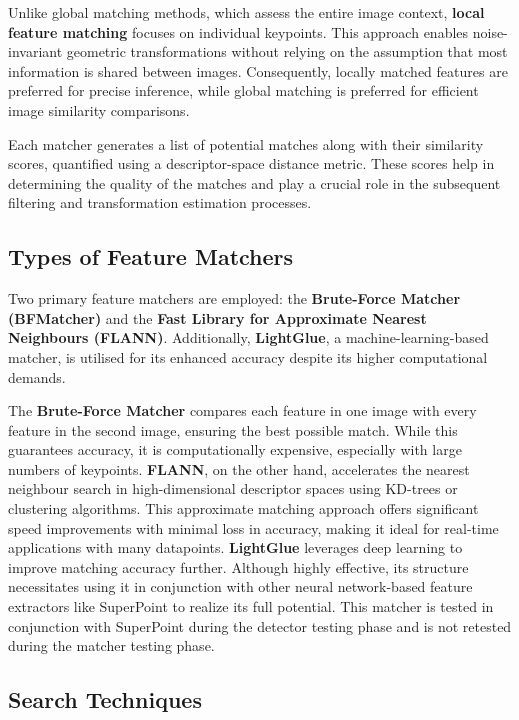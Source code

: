 Unlike global matching methods, which assess the entire image context, \textbf{local feature matching} focuses on individual keypoints. This approach enables noise-invariant geometric transformations without relying on the assumption that most information is shared between images. Consequently, locally matched features are preferred for precise inference, while global matching is preferred for efficient image similarity comparisons.

Each matcher generates a list of potential matches along with their similarity scores, quantified using a descriptor-space distance metric. These scores help in determining the quality of the matches and play a crucial role in the subsequent filtering and transformation estimation processes.

\subsection{Types of Feature Matchers}

Two primary feature matchers are employed: the \textbf{Brute-Force Matcher (BFMatcher)} and the \textbf{Fast Library for Approximate Nearest Neighbours (FLANN)}. Additionally, \textbf{LightGlue}, a machine-learning-based matcher, is utilised for its enhanced accuracy despite its higher computational demands.

The \textbf{Brute-Force Matcher} compares each feature in one image with every feature in the second image, ensuring the best possible match. While this guarantees accuracy, it is computationally expensive, especially with large numbers of keypoints. \textbf{FLANN}, on the other hand, accelerates the nearest neighbour search in high-dimensional descriptor spaces using KD-trees or clustering algorithms. This approximate matching approach offers significant speed improvements with minimal loss in accuracy, making it ideal for real-time applications with many datapoints. \textbf{LightGlue} leverages deep learning to improve matching accuracy further. Although highly effective, its structure necessitates using it in conjunction with other neural network-based feature extractors like SuperPoint to realize its full potential. This matcher is tested in conjunction with SuperPoint during the detector testing phase and is not retested during the matcher testing phase.

\subsection{Search Techniques}

